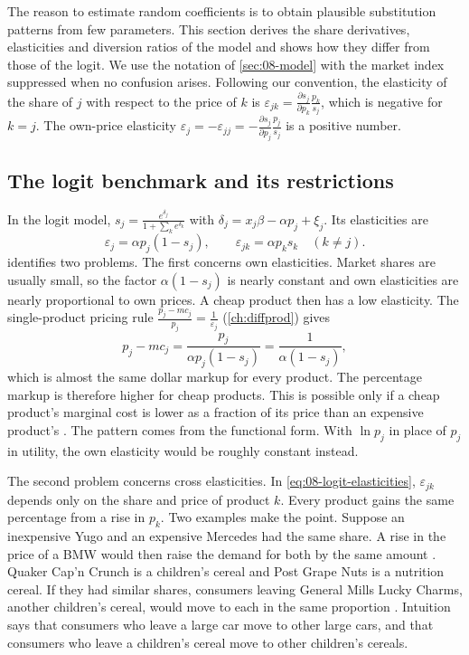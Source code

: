 The reason to estimate random coefficients is to obtain plausible substitution patterns from few
parameters. This section derives the share derivatives, elasticities and diversion ratios of the model and
shows how they differ from those of the logit. We use the notation of \cref{sec:08-model} with the market index
suppressed when no confusion arises. Following our convention, the elasticity of the share of $j$ with respect to
the price of $k$ is $\varepsilon_{jk} = \frac{\partial s_j}{\partial p_k}\frac{p_k}{s_j}$, which is negative for
$k = j$. The own-price elasticity $\varepsilon_j = -\varepsilon_{jj} = -\frac{\partial s_j}{\partial
p_j}\frac{p_j}{s_j}$ is a positive number.

\subsection{The logit benchmark and its restrictions}\label{sec:08-logit-benchmark}

In the logit model, $s_j = \frac{e^{\delta_j}}{1 + \sum_k e^{\delta_k}}$ with $\delta_j = x_j\beta - \alpha p_j
+ \xi_j$. Its elasticities are \citep[p.~522]{Nevo2000a}
\begin{equation}\label{eq:08-logit-elasticities}
  \varepsilon_j = \alpha p_j(1 - s_j), \qquad \varepsilon_{jk} = \alpha p_k s_k \quad (k \ne j).
\end{equation}
\citeauthor{Nevo2000a} identifies two problems. The first concerns own elasticities. Market shares are usually
small, so the factor $\alpha(1 - s_j)$ is nearly constant and own elasticities are nearly proportional to own
prices. A cheap product then has a low elasticity. The single-product pricing rule $\frac{p_j - mc_j}{p_j} =
\frac{1}{\varepsilon_j}$ (\cref{ch:diffprod}) gives
\begin{equation}\label{eq:08-logit-markup}
  p_j - mc_j = \frac{p_j}{\alpha p_j(1 - s_j)} = \frac{1}{\alpha(1 - s_j)},
\end{equation}
which is almost the same dollar markup for every product. The percentage markup is therefore higher for cheap
products. This is possible only if a cheap product's marginal cost is lower as a fraction of its price than an
expensive product's \citep[p.~522]{Nevo2000a}. The pattern comes from the functional form. With $\ln p_j$ in
place of $p_j$ in utility, the own elasticity would be roughly constant instead.

The second problem concerns cross elasticities. In \eqref{eq:08-logit-elasticities}, $\varepsilon_{jk}$ depends
only on the share and price of product $k$. Every product gains the same percentage from a rise in $p_k$. Two
examples make the point. Suppose an inexpensive Yugo and an expensive Mercedes had the same share. A rise in the price
of a BMW would then raise the demand for both by the same amount \citep[p.~847]{BerryLevinsohnPakes1995}. Quaker
Cap'n Crunch is a children's cereal and Post Grape Nuts is a nutrition cereal. If they had similar shares, consumers
leaving General Mills Lucky Charms, another children's cereal, would move to each in the same proportion
\citep[p.~523]{Nevo2000a}. Intuition says that consumers who leave a large car move to other large cars, and
that consumers who leave a children's cereal move to other children's cereals.

